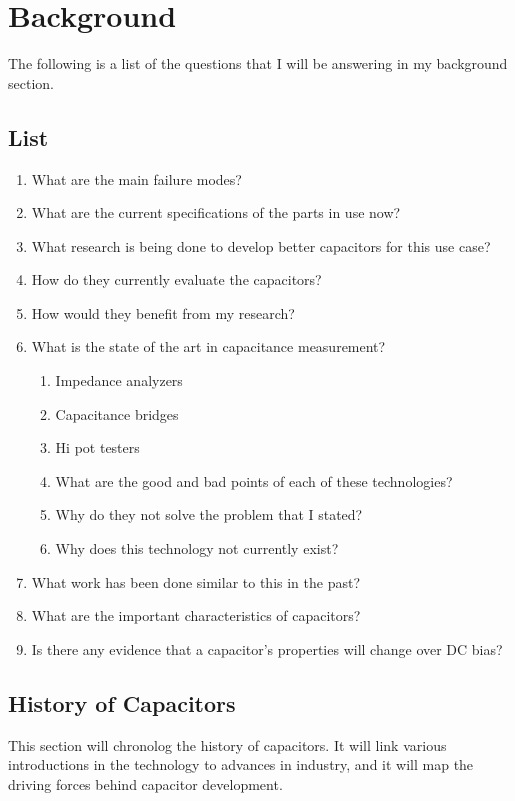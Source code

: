 \section {Background}

The following is a list of the questions that I will be answering in my background section.

\subsection{List}
\begin {enumerate}
    \item What are the main failure modes?
    \item What are the current specifications of the parts in use now?
    \item What research is being done to develop better capacitors for this use case?
    \item How do they currently evaluate the capacitors?
    \item How would they benefit from my research?
    \item What is the state of the art in capacitance measurement?
    \begin {enumerate}
        \item Impedance analyzers
        \item Capacitance bridges
        \item Hi pot testers
        \item What are the good and bad points of each of these technologies?
        \item Why do they not solve the problem that I stated? 
        \item Why does this technology not currently exist?
    \end {enumerate}
    \item What work has been done similar to this in the past?
    \item What are the important characteristics of capacitors?
    \item Is there any evidence that a capacitor's properties will change over DC bias?
\end {enumerate}

\subsection {History of Capacitors}
\label{sec:history}

This section will chronolog the history of capacitors. It will link various introductions in the technology to advances in industry, and it will map the driving forces behind capacitor development.

